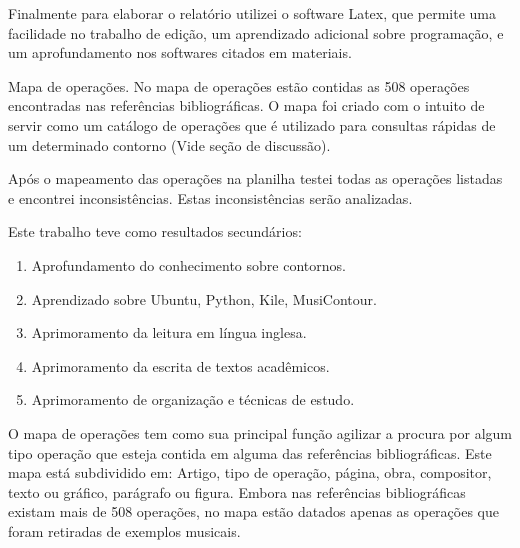 \documentclass[11pt]{article}
\begin{document}
Finalmente para elaborar o relatório utilizei o software Latex, que
permite uma facilidade no trabalho de edição, um aprendizado adicional
sobre programação, e um aprofundamento nos softwares citados em
materiais.

\label{sec:resultados}


Mapa de operações. No mapa de operações estão contidas as 508 operações
encontradas nas referências bibliográficas. O mapa foi criado com o intuito de
servir como um catálogo de operações que é utilizado para consultas rápidas
de um determinado contorno (Vide seção de discussão).

Após o mapeamento das operações na planilha testei todas as operações
listadas e encontrei inconsistências. Estas inconsistências serão analizadas.

Este trabalho teve como resultados secundários:

\begin{enumerate}
\item Aprofundamento do conhecimento sobre contornos.
\item Aprendizado sobre Ubuntu, Python, Kile, MusiContour.
\item Aprimoramento da leitura em língua inglesa.
\item Aprimoramento da escrita de textos acadêmicos.
\item Aprimoramento de organização e técnicas de estudo.
\end{enumerate}

\label{sec:discussao}

O mapa de operações tem como sua principal função agilizar a procura por
algum tipo operação que esteja contida em alguma das referências bibliográficas.
Este mapa está subdividido em: Artigo, tipo de operação, página, obra, compositor,
texto ou gráfico, parágrafo ou figura. Embora nas referências bibliográficas existam
mais de 508 operações, no mapa estão datados apenas as operações que foram retiradas
de exemplos musicais.
\end{document}
